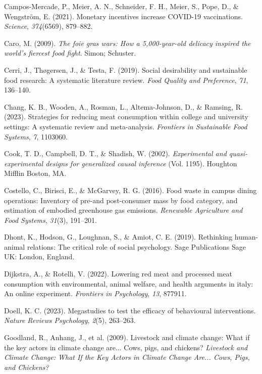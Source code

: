 \documentclass[
  man]{apa6}
\newlength{\cslhangindent}
\newenvironment{CSLReferences}[2] %
 {\begin{list}{}{%
  \setlength{\itemindent}{0pt}
  \setlength{\leftmargin}{0pt}
  \setlength{\parsep}{0pt}
  \ifodd #1
   \setlength{\leftmargin}{\cslhangindent}
   \setlength{\itemindent}{-1\cslhangindent}
  \fi
  \setlength{\itemsep}{#2\baselineskip}}}
 {\end{list}}
\begin{document}
\begin{CSLReferences}{1}{0}
Campos-Mercade, P., Meier, A. N., Schneider, F. H., Meier, S., Pope, D., \& Wengström, E. (2021). Monetary incentives increase COVID-19 vaccinations. \emph{Science}, \emph{374}(6569), 879--882.

Caro, M. (2009). \emph{The foie gras wars: How a 5,000-year-old delicacy inspired the world's fiercest food fight}. Simon; Schuster.

Cerri, J., Thøgersen, J., \& Testa, F. (2019). Social desirability and sustainable food research: A systematic literature review. \emph{Food Quality and Preference}, \emph{71}, 136--140.

Chang, K. B., Wooden, A., Rosman, L., Altema-Johnson, D., \& Ramsing, R. (2023). Strategies for reducing meat consumption within college and university settings: A systematic review and meta-analysis. \emph{Frontiers in Sustainable Food Systems}, \emph{7}, 1103060.

Cook, T. D., Campbell, D. T., \& Shadish, W. (2002). \emph{Experimental and quasi-experimental designs for generalized causal inference} (Vol. 1195). Houghton Mifflin Boston, MA.

Costello, C., Birisci, E., \& McGarvey, R. G. (2016). Food waste in campus dining operations: Inventory of pre-and post-consumer mass by food category, and estimation of embodied greenhouse gas emissions. \emph{Renewable Agriculture and Food Systems}, \emph{31}(3), 191--201.

Dhont, K., Hodson, G., Loughnan, S., \& Amiot, C. E. (2019). Rethinking human-animal relations: The critical role of social psychology. Sage Publications Sage UK: London, England.

Dijkstra, A., \& Rotelli, V. (2022). Lowering red meat and processed meat consumption with environmental, animal welfare, and health arguments in italy: An online experiment. \emph{Frontiers in Psychology}, \emph{13}, 877911.

Doell, K. C. (2023). Megastudies to test the efficacy of behavioural interventions. \emph{Nature Reviews Psychology}, \emph{2}(5), 263--263.

Goodland, R., Anhang, J., et al. (2009). Livestock and climate change: What if the key actors in climate change are... Cows, pigs, and chickens? \emph{Livestock and Climate Change: What If the Key Actors in Climate Change Are... Cows, Pigs, and Chickens?}


\end{CSLReferences}
\end{document}
